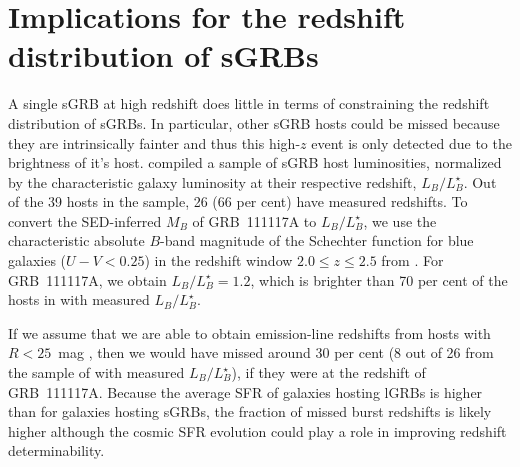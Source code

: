 \documentclass{aa}    %
\begin{document}



\section{Implications for the redshift distribution of sGRBs}

A single sGRB at high redshift does little in terms of constraining the redshift
distribution of sGRBs. In particular, other sGRB hosts could be missed because
they are intrinsically fainter and thus this high-$z$ event is only detected due
to the brightness of it's host. \citet{Berger2014} compiled a sample of sGRB
host luminosities, normalized by the characteristic galaxy luminosity at their
respective redshift, $L_B/L^{\star}_{B}$. Out of the 39 hosts in the sample, 26
(66 per cent) have measured redshifts. To convert the SED-inferred $M_B$ of GRB~111117A
to $L_B/L^{\star}_{B}$, we use the characteristic absolute $B$-band magnitude of
the Schechter function for blue galaxies ($U - V < 0.25$) in the redshift window
$2.0 \leq z \leq 2.5$ from \citet{Marchesini2007}. For GRB~111117A, we obtain
$L_B/L^{\star}_{B} = 1.2$, which is brighter than 70 per cent of the hosts in
\citet{Berger2014} with measured $L_B/L^{\star}_{B}$.

If we assume that we are able to obtain emission-line redshifts from hosts with
$R < 25$~mag \citep{Kruhler2012}, then we would have missed around 30 per cent
(8 out of 26 from the sample of \citealt{Berger2014} with measured
$L_B/L^{\star}_{B}$), if they were at the redshift of GRB~111117A. Because the
average SFR of galaxies hosting lGRBs is higher than for galaxies hosting sGRBs,
the fraction of missed burst redshifts is likely higher although the cosmic SFR
evolution could play a role in improving redshift determinability.
\end{document}
